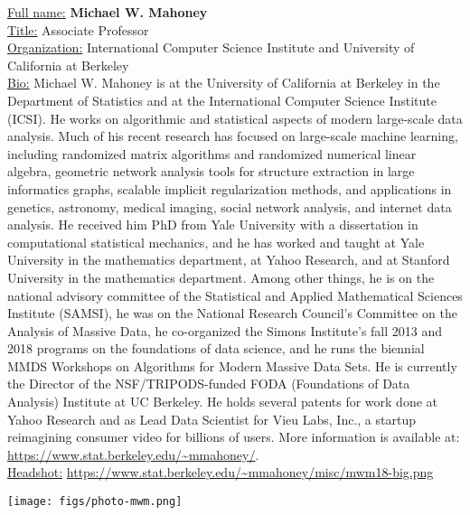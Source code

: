 \documentclass[11pt, oneside]{article}   	%
\begin{document}
\noindent
\begin{minipage}{.7\textwidth}
\underline{Full name:} \textbf{Michael W. Mahoney}\\
\underline{Title:} Associate Professor\\
\underline{Organization:} International Computer Science Institute and
University of California at Berkeley\\
\underline{Bio:} Michael W. Mahoney is at the University of California
at Berkeley in the Department of Statistics and at the International
Computer Science Institute (ICSI).  He works on algorithmic and
statistical aspects of modern large-scale data analysis.  Much of his
recent research has focused on large-scale machine learning, including
randomized matrix algorithms and randomized numerical linear algebra,
geometric network analysis tools for structure extraction in large
informatics graphs, scalable implicit regularization methods, and
applications in genetics, astronomy, medical imaging, social network
analysis, and internet data analysis.  He received him PhD from Yale
University with a dissertation in computational statistical mechanics,
and he has worked and taught at Yale University in the mathematics
department, at Yahoo Research, and at Stanford University in the
mathematics department.  Among other things, he is on the national
advisory committee of the Statistical and Applied Mathematical
Sciences Institute (SAMSI), he was on the National Research Council's
Committee on the Analysis of Massive Data, he co-organized the Simons
Institute's fall 2013 and 2018 programs on the foundations of data
science, and he runs the biennial MMDS Workshops on Algorithms for
Modern Massive Data Sets.  He is currently the Director of the
NSF/TRIPODS-funded FODA (Foundations of Data Analysis) Institute at UC
Berkeley.  He holds several patents for work done at Yahoo Research
and as Lead Data Scientist for Vieu Labs, Inc., a  startup reimagining
consumer video for billions of users.  More information is available
at: \url{https://www.stat.berkeley.edu/~mmahoney/}.\\
\underline{Headshot:} \url{https://www.stat.berkeley.edu/~mmahoney/misc/mwm18-big.png}
 \end{minipage}\hfill
\begin{minipage}[t]{.25\textwidth}
  \texttt{[image: figs/photo-mwm.png]}
\end{minipage}
\end{document}
